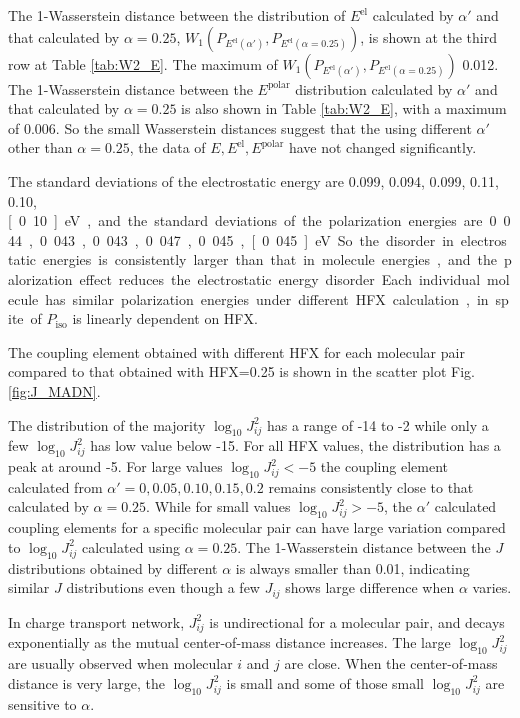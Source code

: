 \documentclass[%
 reprint,
 amsmath,amssymb,
 aps,
]{revtex4-2}
\begin{document}
The 1-Wasserstein distance between the distribution of $E^\text{el}$ calculated by $\alpha'$ and that calculated by $\alpha=0.25$, $W_1(P_{E^\text{el}(\alpha')}, P_{E^\text{el}(\alpha=0.25)})$, is shown at the third row at Table \ref{tab:W2_E}. 
The maximum of $W_1(P_{E^\text{el}(\alpha')}, P_{E^\text{el}(\alpha=0.25)})$ 0.012. The 1-Wasserstein distance between the $E^\text{polar}$ distribution calculated by $\alpha'$ and that calculated by $\alpha=0.25$ is also shown in Table \ref{tab:W2_E}, with a maximum of 0.006. So the small Wasserstein distances suggest that the using different $\alpha'$ other than $\alpha=0.25$, the data of $E, E^\text{el}, E^\text{polar}$ have not changed significantly.

The standard deviations of the electrostatic energy are 0.099, 0.094, 0.099, 0.11, 0.10, \unit[0.10]{eV}, and the standard deviations of the polarization energies are 0.044, 0.043, 0.043, 0.047, 0.045, \unit[0.045]{eV}. So the disorder in electrostatic energies is consistently larger than that in molecule energies, and the palorization effect reduces the electrostatic energy disorder. 
Each individual molecule has similar polarization energies under different HFX calculation, in spite of $P_\text{iso}$ is linearly dependent on HFX. 

The coupling element obtained with different HFX for each molecular pair compared to that obtained with HFX=0.25 is shown in the scatter plot Fig. \ref{fig:J_MADN}.


The distribution of the majority $\log_{10} J_{ij}^2$ has a range of -14 to -2 while only a few $\log_{10} J_{ij}^2$ has low value below -15. For all HFX values, the distribution has a peak at around -5. 
For large values $\log_{10} J_{ij}^2 < -5$ the coupling element calculated from $\alpha'=0, 0.05, 0.10, 0.15, 0.2$ remains consistently close to that calculated by $\alpha=0.25$. While for small values $\log_{10} J_{ij}^2 > -5$, the $\alpha'$ calculated coupling elements for a specific molecular pair can have large variation compared to $\log_{10} J_{ij}^2$ calculated using $\alpha=0.25$.
The 1-Wasserstein distance between the $J$ distributions obtained by different $\alpha$ is always smaller than 0.01,  
indicating similar $J$ distributions even though a few $J_{ij}$ shows large difference when $\alpha$ varies. 

In charge transport network, $J_{ij}^2$ is undirectional for a molecular pair, and decays exponentially as the mutual center-of-mass distance increases. The large $\log_{10} J_{ij}^2$ are usually observed when molecular $i$ and $j$ are close.
When the center-of-mass distance is very large, the $\log_{10} J_{ij}^2$ is small and some of those small $\log_{10} J_{ij}^2$ are sensitive to $\alpha$. 
\end{document}
